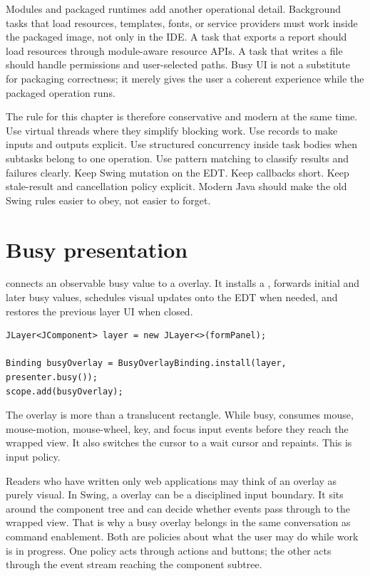 Modules and packaged runtimes add another operational detail. Background tasks
that load resources, templates, fonts, or service providers must work inside
the packaged image, not only in the IDE. A task that exports a report should
load resources through module-aware resource APIs. A task that writes a file
should handle permissions and user-selected paths. Busy UI is not a substitute
for packaging correctness; it merely gives the user a coherent experience while
the packaged operation runs.

The rule for this chapter is therefore conservative and modern at the same
time. Use virtual threads where they simplify blocking work. Use records to
make inputs and outputs explicit. Use structured concurrency inside task
bodies when subtasks belong to one operation. Use pattern matching to classify
results and failures clearly. Keep Swing mutation on the EDT. Keep callbacks
short. Keep stale-result and cancellation policy explicit. Modern Java should
make the old Swing rules easier to obey, not easier to forget.

\section{Busy presentation}

 connects an observable busy value to a 
overlay. It installs a , forwards initial and later busy
values, schedules visual updates onto the EDT when needed, and restores the
previous layer UI when closed.

\begin{lstlisting}[caption={Wrapping a form in a busy layer.}]
JLayer<JComponent> layer = new JLayer<>(formPanel);

Binding busyOverlay = BusyOverlayBinding.install(layer, presenter.busy());
scope.add(busyOverlay);
\end{lstlisting}

The overlay is more than a translucent rectangle. While busy,
 consumes mouse, mouse-motion, mouse-wheel, key, and
focus input events before they reach the wrapped view. It also switches the
cursor to a wait cursor and repaints. This is input policy.

Readers who have written only web applications may think of an overlay as
purely visual. In Swing, a  overlay can be a disciplined input
boundary. It sits around the component tree and can decide whether events pass
through to the wrapped view. That is why a busy overlay belongs in the same
conversation as command enablement. Both are policies about what the user may
do while work is in progress. One policy acts through actions and buttons; the
other acts through the event stream reaching the component subtree.

